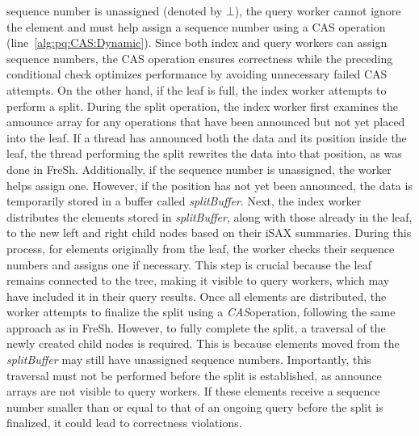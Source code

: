 \documentclass[a4paper,11pt,twoside,openany]{book}
\newcommand{\CAS}{\mbox{\textit{CAS}}}
\begin{document}
sequence number is unassigned (denoted by \( \bot \)), the query worker cannot ignore
the element and must help assign a sequence number using a CAS operation
(line~\ref{alg:pq:CAS:Dynamic}). Since both index and query workers can assign sequence
numbers, the CAS operation ensures correctness while the preceding conditional
check optimizes performance by avoiding unnecessary failed CAS attempts.
%
On the other hand, if the leaf is full, the index worker attempts to perform a split.  
During the split operation, the index worker first examines the announce array
for any operations that have been announced but not yet placed into the leaf.
If a thread has announced both the data and its position inside the leaf,
the thread performing the split rewrites the data into that position,
as was done in FreSh. Additionally, if the sequence number is unassigned,
the worker helps assign one. However, if the position has not yet been announced,
the data is temporarily stored in a buffer called \textit{splitBuffer}.  
%
Next, the index worker distributes the elements stored in \textit{splitBuffer},
along with those already in the leaf, to the new left and right child nodes
based on their iSAX summaries. During this process, for elements originally
from the leaf, the worker checks their sequence numbers and assigns one
if necessary. This step is crucial because the leaf remains connected to the
tree, making it visible to query workers, which may have included it in their
query results.  
%
Once all elements are distributed, the worker attempts to finalize the split
using a \CAS operation, following the same approach as in FreSh. However,
to fully complete the split, a traversal of the newly created child nodes
is required. This is because elements moved from the \textit{splitBuffer}
may still have unassigned sequence numbers. Importantly, this traversal must
not be performed before the split is established, as announce arrays are not
visible to query workers. If these elements receive a sequence number smaller
than or equal to that of an ongoing query before the split is finalized,
it could lead to correctness violations.
% 
\end{document}
